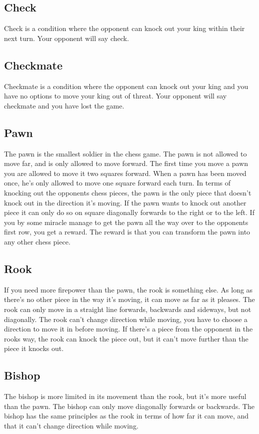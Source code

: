 \documentclass{article}
\begin{document}
\subsection*{Check}
Check is a condition where the opponent can knock out your king within their next turn. Your opponent will say check.

\subsection*{Checkmate} Checkmate is a condition where the opponent can knock out your king and you have no options to move your king out of threat. Your opponent will say checkmate and you have lost the game.

\subsection*{Pawn} The pawn is the smallest soldier in the chess game. The pawn is not allowed to move far, and is only allowed to move forward. The first time you move a pawn you are allowed to move it two squares forward. When a pawn has been moved once, he’s only allowed to move one square forward each turn. In terms of knocking out the opponents chess pieces, the pawn is the only piece that doesn’t knock out in the direction it’s moving. If the pawn wants to knock out another piece it can only do so on square diagonally forwards to the right or to the left.
If you by some miracle manage to get the pawn all the way over to the opponents first row, you get a reward. The reward is that you can transform the pawn into any other chess piece.  

\subsection*{Rook} If you need more firepower than the pawn, the rook is something else. As long as there’s no other piece in the way it’s moving, it can move as far as it pleases. The rook can only move in a straight line forwards, backwards and sideways, but not diagonally. The rook can’t change direction while moving, you have to choose a direction to move it in before moving. If there’s a piece from the opponent in the rooks way, the rook can knock the piece out, but it can’t move further than the piece it knocks out. 

\subsection*{Bishop} The bishop is more limited in its movement than the rook, but it’s more useful than the pawn. The bishop can only move diagonally forwards or backwards. The bishop has the same principles as the rook in terms of how far it can move, and that it can’t change direction while moving. 
\end{document}
